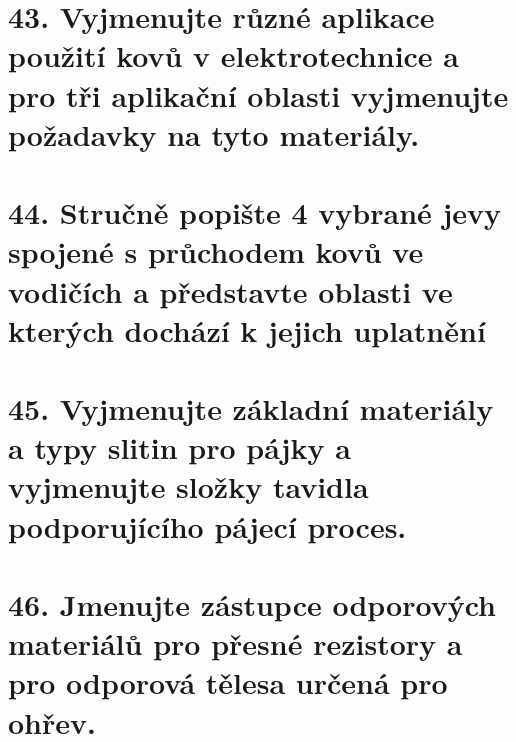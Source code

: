 \documentclass[11pt,a4paper]{article}
\begin{document}
\noindent\begin{minipage}[b]{\linewidth}
\section*{43. Vyjmenujte různé aplikace použití kovů v elektrotechnice a pro tři aplikační oblasti vyjmenujte požadavky na tyto materiály.}

\par\end{minipage}\par\vspace{6mm}
\noindent\begin{minipage}[b]{\linewidth}
\section*{44. Stručně popište 4 vybrané jevy spojené s průchodem kovů ve vodičích a představte oblasti ve kterých dochází k jejich uplatnění}

\par\end{minipage}\par\vspace{6mm}
\noindent\begin{minipage}[b]{\linewidth}
\section*{45. Vyjmenujte základní materiály a typy slitin pro pájky a vyjmenujte složky tavidla podporujícího pájecí proces.}

\par\end{minipage}\par\vspace{6mm}
\noindent\begin{minipage}[b]{\linewidth}
\section*{46. Jmenujte zástupce odporových materiálů pro přesné rezistory a pro odporová tělesa určená pro ohřev.}

\par\end{minipage}\par\vspace{6mm}
\end{document}
